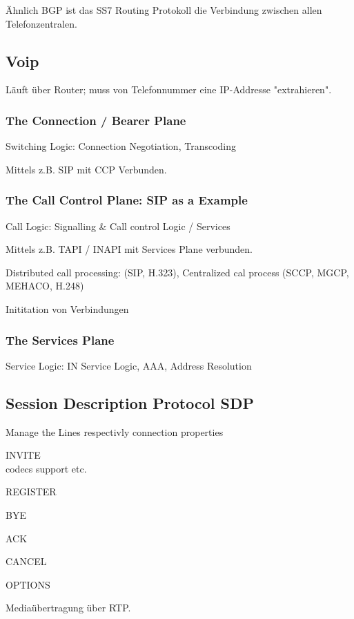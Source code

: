 Ähnlich BGP ist das SS7 Routing Protokoll die Verbindung zwischen allen Telefonzentralen.
	
\subsection{Voip}
Läuft über Router; muss von Telefonnummer eine IP-Addresse "extrahieren".
	
\subsubsection{The Connection / Bearer Plane}
Switching Logic: Connection Negotiation, Transcoding

Mittels z.B. SIP mit CCP Verbunden.

\subsubsection{The Call Control Plane: SIP as a Example}
Call Logic: Signalling \& Call control
Logic / Services

Mittels z.B. TAPI / INAPI mit Services Plane verbunden.

Distributed call processing: (SIP, H.323), Centralized cal process (SCCP, MGCP, MEHACO, H.248)

Inititation von Verbindungen

\subsubsection{The Services Plane}
Service Logic: IN Service Logic, AAA, Address Resolution


\subsection{Session Description Protocol SDP}
Manage the Lines respectivly connection properties

\begin{description}
\item INVITE \hfill \\
	codecs support etc.
\item REGISTER
\item BYE
\item ACK 
\item CANCEL
\item OPTIONS
\end{description}

Mediaübertragung über RTP.

